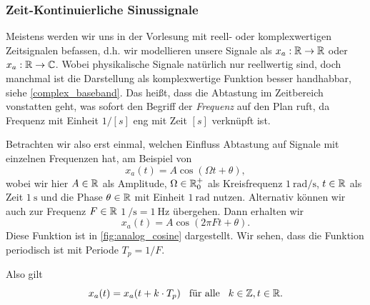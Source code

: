 \subsubsection{Zeit-Kontinuierliche Sinussignale}
%
Meistens werden wir uns in der Vorlesung mit reell- oder komplexwertigen Zeitsignalen befassen, d.h. wir modellieren unsere Signale als $x_a : \mathbb{R} \rightarrow \mathbb{R}$ oder $x_a: \mathbb{R} \rightarrow \mathbb{C}$.
Wobei physikalische Signale natürlich nur reellwertig sind, doch manchmal ist die Darstellung als komplexwertige Funktion besser handhabbar, siehe \eqref{complex_baseband}.
Das heißt, dass die Abtastung im Zeitbereich vonstatten geht, was sofort den Begriff der \emph{Frequenz} auf den Plan ruft, da Frequenz mit Einheit $1/[s]$ eng mit Zeit $[s]$ verknüpft ist.

Betrachten wir also erst einmal, welchen Einfluss Abtastung auf Signale mit einzelnen Frequenzen hat, am Beispiel von
%
\begin{equation}\label{eq:analog_cosine}
    x_a(t) = A \cos(\Omega t + \theta),
\end{equation}
%
wobei wir hier $A \in \mathbb{R}$ als Amplitude, $\Omega \in \mathbb{R}^+_0$ als Kreisfrequenz $\SI{1}{\radian\per\second}$, $t \in \mathbb{R}$ als Zeit $\SI{1}{\second}$ und die Phase $\theta \in \mathbb{R}$ mit Einheit $\SI{1}{\radian}$ nutzen.
Alternativ können wir auch zur Frequenz $F \in \mathbb{R}$ $\SI{1}{\per\second} = \SI{1}{\hertz}$ übergehen.
Dann erhalten wir
\[
x_a(t) = A \cos(2 \pi F t + \theta).
\]
Diese Funktion ist in \cref{fig:analog_cosine} dargestellt.
Wir sehen, dass die Funktion periodisch ist mit Periode $T_p = 1/F$.

Also gilt
\[
x_a(t) = x_a(t + k \cdot T_p) {\hspace{3mm} \text{für alle} \hspace{3mm}} k \in \mathbb{Z}, t \in \mathbb{R}.
\]

